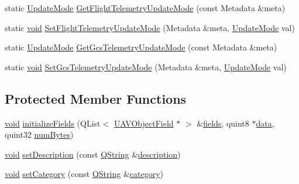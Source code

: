 \begin{DoxyCompactItemize}
\item 
static \hyperlink{group___u_a_v_objects_plugin_ga08c0580992fcd51c2b44734e2d24cac6}{\-Update\-Mode} \hyperlink{group___u_a_v_objects_plugin_ga6cd43aaa339c4bd8beead8988bb9f1a6}{\-Get\-Flight\-Telemetry\-Update\-Mode} (const \-Metadata \&meta)
\item 
static \hyperlink{group___u_a_v_objects_plugin_ga444cf2ff3f0ecbe028adce838d373f5c}{void} \hyperlink{group___u_a_v_objects_plugin_gaa9fa161b9a5607e4ee1086b72f1b70e5}{\-Set\-Flight\-Telemetry\-Update\-Mode} (\-Metadata \&meta, \hyperlink{group___u_a_v_objects_plugin_ga08c0580992fcd51c2b44734e2d24cac6}{\-Update\-Mode} val)
\item 
static \hyperlink{group___u_a_v_objects_plugin_ga08c0580992fcd51c2b44734e2d24cac6}{\-Update\-Mode} \hyperlink{group___u_a_v_objects_plugin_ga81651b86ef2cf0b05483152c6728b742}{\-Get\-Gcs\-Telemetry\-Update\-Mode} (const \-Metadata \&meta)
\item 
static \hyperlink{group___u_a_v_objects_plugin_ga444cf2ff3f0ecbe028adce838d373f5c}{void} \hyperlink{group___u_a_v_objects_plugin_ga8fdb0f35b52c8dea0a512fd411d2346e}{\-Set\-Gcs\-Telemetry\-Update\-Mode} (\-Metadata \&meta, \hyperlink{group___u_a_v_objects_plugin_ga08c0580992fcd51c2b44734e2d24cac6}{\-Update\-Mode} val)
\end{DoxyCompactItemize}
\subsection*{\-Protected \-Member \-Functions}
\begin{DoxyCompactItemize}
\item 
\hyperlink{group___u_a_v_objects_plugin_ga444cf2ff3f0ecbe028adce838d373f5c}{void} \hyperlink{group___u_a_v_objects_plugin_ga7aa3a71a68a9190731f720ad0eb1c772}{initialize\-Fields} (\-Q\-List$<$ \hyperlink{class_u_a_v_object_field}{\-U\-A\-V\-Object\-Field} $\ast$ $>$ \&\hyperlink{group___u_a_v_objects_plugin_gaafc65699167bc5cedfd058400e484df6}{fields}, quint8 $\ast$\hyperlink{group___u_a_v_objects_plugin_gadb2f4800bd3b6fb89c0f7c9fb67e49ff}{data}, quint32 \hyperlink{group___u_a_v_objects_plugin_ga260cfb19e663f64d51ba1258e760a207}{num\-Bytes})
\item 
\hyperlink{group___u_a_v_objects_plugin_ga444cf2ff3f0ecbe028adce838d373f5c}{void} \hyperlink{group___u_a_v_objects_plugin_ga9310ee9c9869110219a7fcd311aaaf28}{set\-Description} (const \hyperlink{group___u_a_v_objects_plugin_gab9d252f49c333c94a72f97ce3105a32d}{\-Q\-String} \&\hyperlink{group___u_a_v_objects_plugin_gaeeb0e865791ad6b21d83ef571d1ce48b}{description})
\item 
\hyperlink{group___u_a_v_objects_plugin_ga444cf2ff3f0ecbe028adce838d373f5c}{void} \hyperlink{group___u_a_v_objects_plugin_gac1d47f2428a0939dbe9544b6c6add6b5}{set\-Category} (const \hyperlink{group___u_a_v_objects_plugin_gab9d252f49c333c94a72f97ce3105a32d}{\-Q\-String} \&\hyperlink{group___u_a_v_objects_plugin_gae96da3f59e51fb5c3ca43056bda4a63e}{category})
\end{DoxyCompactItemize}
